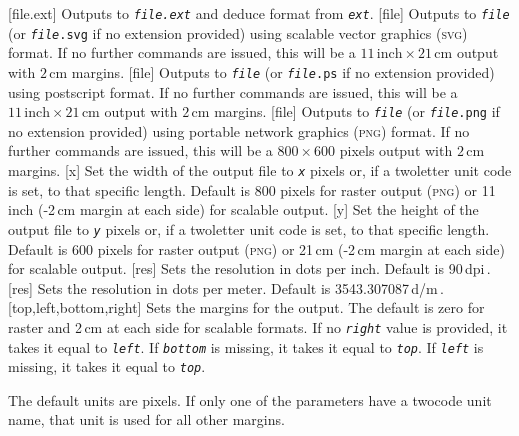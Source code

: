 \documentclass[letterpaper]{article}
\begin{document}
\begin{clioptions}
[file.ext] Outputs to \texttt{\textit{file.ext}} and
  deduce format from \texttt{\textit{ext}}.
[file] Outputs to \texttt{\textit{file}} (or
  \texttt{\textit{file}.svg} if no extension provided) using scalable
  vector graphics (\textsc{svg}) format.
  If no further commands are issued, this will be a
  $11\,\textrm{inch}\times21\,\textrm{cm}$ output with $2\,\textrm{cm}$
  margins.
[file] Outputs to \texttt{\textit{file}} (or
  \texttt{\textit{file}.ps} if no extension provided) using postscript
  format.
  If no further commands are issued, this will be a
  $11\,\textrm{inch}\times21\,\textrm{cm}$ output with $2\,\textrm{cm}$
  margins.
[file] Outputs to \texttt{\textit{file}} (or
  \texttt{\textit{file}.png} if no extension provided) using portable
  network graphics (\textsc{png}) format.
  If no further commands are issued, this will be a
  $800\times600$ pixels output with $2\,\textrm{cm}$
  margins.
[x] Set the width of the output file to
  \texttt{\textit{x}} pixels or, if a twoletter unit code is set, to
  that specific length. Default is 800 pixels for raster output
  (\textsc{png}) or 11\,inch (-2\,cm margin at each side) for scalable
  output.
[y] Set the height of the output file to
  \texttt{\textit{y}} pixels or, if a twoletter unit code is set, to
  that specific length. Default is 600 pixels for raster output
  (\textsc{png}) or 21\,cm (-2\,cm margin at each side) for scalable
  output.
[res] Sets the resolution in dots per inch.
  Default is 90\,dpi\,.
[res] Sets the resolution in dots per meter.
  Default is 3543.307087\,d/m\,.
[top,left,bottom,right] Sets the margins for the
  output. The default is zero for raster and 2\,cm at each side for
  scalable formats.
  If no \texttt{\textit{right}} value is provided, it takes it equal to
  \texttt{\textit{left}}. If \texttt{\textit{bottom}} is missing, it
  takes it equal to \texttt{\textit{top}}. If \texttt{\textit{left}}
  is missing, it takes it equal to \texttt{\textit{top}}.
  
  The default units are pixels. If only one of the parameters have a
  twocode unit name, that unit is used for all other margins.
  

\end{clioptions}
\end{document}
